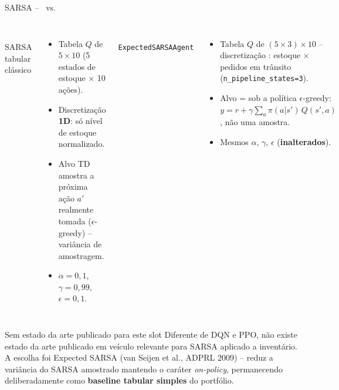 \begin{frame}{SARSA -- \antes\ vs. \depois}
  \begin{columns}[T,onlytextwidth]
      \antes\\[0.3em]
      \small SARSA tabular clássico
      \begin{itemize}\footnotesize
        \item Tabela $Q$ de $5\times10$ (5 estados de estoque $\times$ 10
          ações).
        \item Discretização \textbf{1D}: só nível de estoque normalizado.
        \item Alvo TD amostra a próxima ação $a'$ realmente tomada
          ($\epsilon$-greedy) -- variância de amostragem.
        \item $\alpha=0{,}1$, $\gamma=0{,}99$, $\epsilon=0{,}1$.
      \end{itemize}
      \depois\\[0.3em]
      \small \texttt{ExpectedSARSAAgent}
      \begin{itemize}\footnotesize
        \item Tabela $Q$ de $(5\times3)\times10$ -- discretização
          : estoque $\times$ pedidos em trânsito
          (\texttt{n\_pipeline\_states=3}).
        \item Alvo =  sob a política $\epsilon$-greedy:
          $y=r+\gamma\sum_a \pi(a|s')\,Q(s',a)$, não uma amostra.
        \item Mesmos $\alpha$, $\gamma$, $\epsilon$ (\textbf{inalterados}).
      \end{itemize}
  \end{columns}
  \vspace{0.8em}

  \begin{block}{Sem estado da arte publicado para este slot}
    \small Diferente de DQN e PPO, não existe estado da arte publicado em
    veículo relevante para SARSA aplicado a inventário. A escolha foi
    Expected SARSA (van Seijen et al., ADPRL 2009) -- reduz a variância do
    SARSA amostrado mantendo o caráter \textit{on-policy}, permanecendo
    deliberadamente como \textbf{baseline tabular simples} do portfólio.
  \end{block}

\end{frame}
